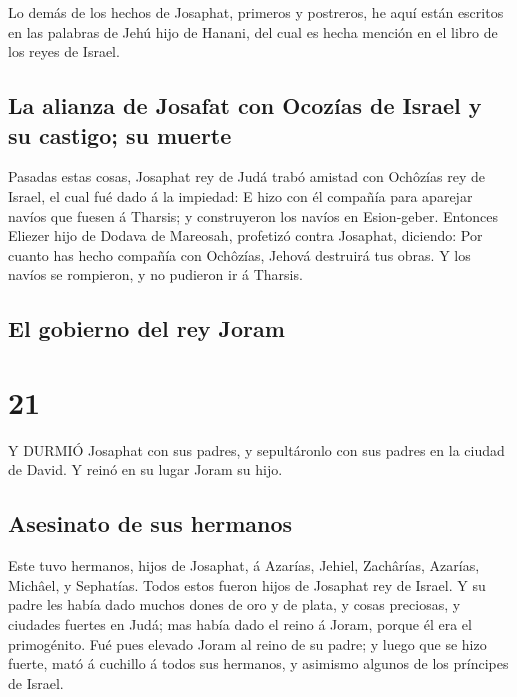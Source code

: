  Lo demás de los hechos de Josaphat, primeros y postreros,
he aquí están escritos en las palabras de Jehú hijo de Hanani, del cual
es hecha mención en el libro de los reyes de Israel.

\hypertarget{la-alianza-de-josafat-con-ocozuxedas-de-israel-y-su-castigo-su-muerte}{%
\subsection{La alianza de Josafat con Ocozías de Israel y su castigo; su
muerte}\label{la-alianza-de-josafat-con-ocozuxedas-de-israel-y-su-castigo-su-muerte}}

 Pasadas estas cosas, Josaphat rey de Judá trabó amistad
con Ochôzías rey de Israel, el cual fué dado á la impiedad:
 E hizo con él compañía para aparejar navíos que fuesen á
Tharsis; y construyeron los navíos en Esion-geber. 
Entonces Eliezer hijo de Dodava de Mareosah, profetizó contra Josaphat,
diciendo: Por cuanto has hecho compañía con Ochôzías, Jehová destruirá
tus obras. Y los navíos se rompieron, y no pudieron ir á Tharsis.

\hypertarget{el-gobierno-del-rey-joram}{%
\subsection{El gobierno del rey Joram}\label{el-gobierno-del-rey-joram}}

\hypertarget{section-20}{%
\section{21}\label{section-20}}

 Y DURMIÓ Josaphat con sus padres, y sepultáronlo con sus
padres en la ciudad de David. Y reinó en su lugar Joram su hijo.

\hypertarget{asesinato-de-sus-hermanos}{%
\subsection{Asesinato de sus hermanos}\label{asesinato-de-sus-hermanos}}

 Este tuvo hermanos, hijos de Josaphat, á Azarías, Jehiel,
Zachârías, Azarías, Michâel, y Sephatías. Todos estos fueron hijos de
Josaphat rey de Israel.  Y su padre les había dado muchos
dones de oro y de plata, y cosas preciosas, y ciudades fuertes en Judá;
mas había dado el reino á Joram, porque él era el primogénito.
 Fué pues elevado Joram al reino de su padre; y luego que se
hizo fuerte, mató á cuchillo á todos sus hermanos, y asimismo algunos de
los príncipes de Israel.

